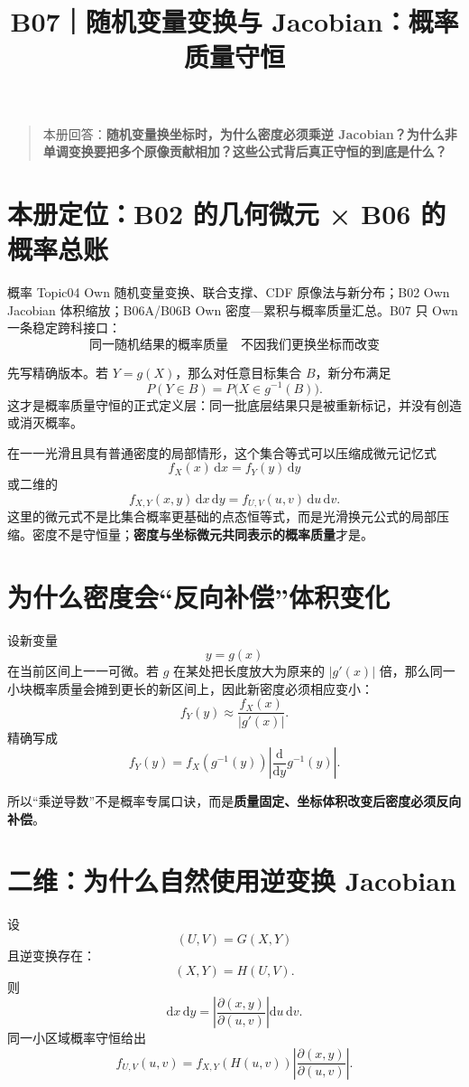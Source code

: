 \documentclass[profile=standard]{ipara-handbook}
\title{B07｜随机变量变换与 Jacobian：概率质量守恒}
\author{}
\date{}
\begin{document}
\maketitle

\begin{quote}
本册回答：\textbf{随机变量换坐标时，为什么密度必须乘逆 Jacobian？为什么非单调变换要把多个原像贡献相加？这些公式背后真正守恒的到底是什么？}
\end{quote}

\section{本册定位：B02 的几何微元 × B06 的概率总账}
概率 Topic04 Own 随机变量变换、联合支撑、CDF 原像法与新分布；B02 Own Jacobian 体积缩放；B06A/B06B Own 密度—累积与概率质量汇总。B07 只 Own 一条稳定跨科接口：
\[
\boxed{
\text{同一随机结果的概率质量}
\quad\text{不因我们更换坐标而改变}
}
\]

先写精确版本。若 $Y=g(X)$，那么对任意目标集合 $B$，新分布满足
\[
P(Y\in B)=P\bigl(X\in g^{-1}(B)\bigr).
\]
这才是概率质量守恒的正式定义层：同一批底层结果只是被重新标记，并没有创造或消灭概率。

在一一光滑且具有普通密度的局部情形，这个集合等式可以压缩成微元记忆式
\[
\boxed{f_X(x)\,\mathrm{d}x=f_Y(y)\,\mathrm{d}y}
\]
或二维的
\[
\boxed{f_{X,Y}(x,y)\,\mathrm{d}x\,\mathrm{d}y=f_{U,V}(u,v)\,\mathrm{d}u\,\mathrm{d}v.}
\]
这里的微元式不是比集合概率更基础的点态恒等式，而是光滑换元公式的局部压缩。密度不是守恒量；\textbf{密度与坐标微元共同表示的概率质量}才是。

\section{为什么密度会“反向补偿”体积变化}
设新变量
\[
y=g(x)
\]
在当前区间上一一可微。若 $g$ 在某处把长度放大为原来的 $\lvert g'(x)\rvert$ 倍，那么同一小块概率质量会摊到更长的新区间上，因此新密度必须相应变小：
\[
f_Y(y)\approx \frac{f_X(x)}{\lvert g'(x)\rvert}.
\]
精确写成
\[
\boxed{
f_Y(y)=f_X(g^{-1}(y))\left\lvert\frac{\mathrm{d}}{\mathrm{d}y}g^{-1}(y)\right\rvert.}
\]

所以“乘逆导数”不是概率专属口诀，而是\textbf{质量固定、坐标体积改变后密度必须反向补偿}。

\section{二维：为什么自然使用逆变换 Jacobian}
设
\[
(U,V)=G(X,Y)
\]
且逆变换存在：
\[
(X,Y)=H(U,V).
\]
则
\[
\mathrm{d}x\,\mathrm{d}y
=\left\lvert\frac{\partial(x,y)}{\partial(u,v)}\right\rvert\mathrm{d}u\,\mathrm{d}v.
\]
同一小区域概率守恒给出
\[
\boxed{
f_{U,V}(u,v)
=f_{X,Y}(H(u,v))
\left\lvert\frac{\partial(x,y)}{\partial(u,v)}\right\rvert.}
\]
\end{document}
